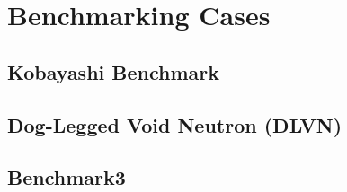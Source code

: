 \chapter{Benchmarking Cases}

\section{Kobayashi Benchmark}
\section{Dog-Legged Void Neutron (DLVN)}
\section{Benchmark3}

